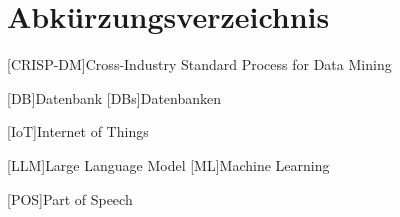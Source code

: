 \chapter{Abkürzungsverzeichnis}
\begin{acronym}[CRISP-DM] %
    [CRISP-DM]{Cross-Industry Standard Process for Data Mining}

    [DB]{Datenbank}
    [DBs]{Datenbanken}

    [IoT]{Internet of Things}

    [LLM]{Large Language Model}
    [ML]{Machine Learning}

    [POS]{Part of Speech}
\end{acronym}